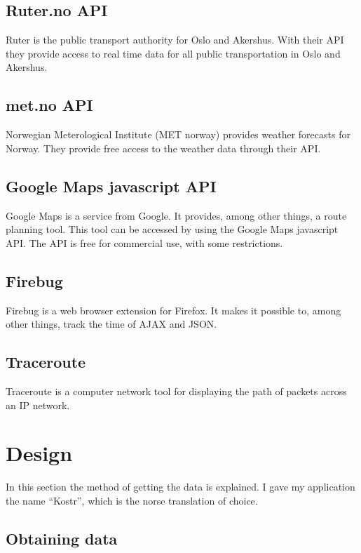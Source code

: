 \documentclass[10pt,a4paper]{article}
\begin{document}
\subsection{Ruter.no API}
\label{sec:ruter.no-api}
Ruter is the public transport authority for Oslo and Akershus\cite{ruterinfo}. With their API they provide access to real time data for all public transportation in Oslo and Akershus.

\subsection{met.no API}
\label{sec:met.no-api-1}
Norwegian Meterological Institute (MET norway) provides weather forecasts for Norway. They provide free access to the weather data through their API. \cite{metnoinfo}

\subsection{Google Maps javascript API}
\label{sec:google-maps-javascr-1}
Google Maps is a service from Google. It provides, among other things, a route planning tool. This tool can be accessed by using the Google Maps javascript API. The API is free for commercial use, with some restrictions. \cite{gmapsinfo}

\subsection{Firebug}
Firebug is a web browser extension for Firefox. It makes it possible to, among other things, track the time of AJAX and JSON. \cite{firebug}

\subsection{Traceroute}
Traceroute is a computer network tool for displaying the path of packets across an IP network. \cite{traceroute}
\section{Design}
In this section the method of getting the data is explained. I gave my application the name ``Kostr'', which is the norse translation of choice.

\subsection{Obtaining data}
\label{sec:architecture}
\end{document}
